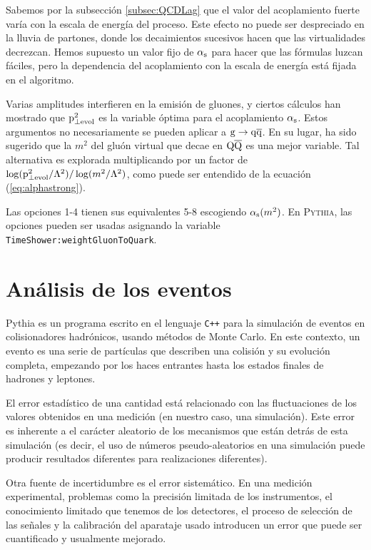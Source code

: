 \documentclass[a4paper,12pt]{article}
\begin{document}
Sabemos por la subsección \ref{subsec:QCDLag} que el valor del acoplamiento fuerte varía con la escala de energía del proceso. Este efecto no puede ser despreciado en la lluvia de partones, donde los decaimientos sucesivos hacen que las virtualidades decrezcan. Hemos supuesto un valor fijo de $\alpha_{\mathrm{s}}$ para hacer que las fórmulas luzcan fáciles, pero la dependencia del acoplamiento con la escala de energía está fijada en el algoritmo.

Varias amplitudes interfieren en la emisión de gluones, y ciertos cálculos han mostrado que ${\mathrm p}^2_{\perp\mathrm{evol}}$ es la variable óptima para el acoplamiento $\alpha_{\mathrm{s}}$. Estos argumentos no necesariamente se pueden aplicar a ${\mathrm g}\to{\mathrm q}\overline{\mathrm q}$. En su lugar, ha sido sugerido que la $m^2$ del gluón virtual que decae en ${\mathrm Q}\overline{\mathrm Q}$ es una mejor variable. Tal alternativa es explorada multiplicando por un factor de $\log({\mathrm p}^2_{\perp\mathrm{evol}}/\Lambda^2)/\log(m^2/\Lambda^2)$, como puede ser entendido de la ecuación (\ref{eq:alphastrong}).

Las opciones 1-4 tienen sus equivalentes 5-8 escogiendo $\alpha_{\mathrm{s}}(m^2)$. En \textsc{Pythia}, las opciones pueden ser usadas asignando la variable \verb|TimeShower:weightGluonToQuark|.


\section{Análisis de los eventos}
\label{sec:analysis}

Pythia es un programa escrito en el lenguaje \verb|C++| para la simulación de eventos en colisionadores hadrónicos, usando métodos de Monte Carlo. En este contexto, un evento es una serie de partículas que describen una colisión y su evolución completa, empezando por los haces entrantes hasta los estados finales de hadrones y leptones.

El error estadístico de una cantidad está relacionado con las fluctuaciones de los valores obtenidos en una medición (en nuestro caso, una simulación). Este error es inherente a el carácter aleatorio de los mecanismos que están detrás de esta simulación (es decir, el uso de números pseudo-aleatorios en una simulación puede producir resultados diferentes para realizaciones diferentes).

Otra fuente de incertidumbre es el error sistemático. En una medición experimental, problemas como la precisión limitada de los instrumentos, el conocimiento limitado que tenemos de los detectores, el proceso de selección de las señales y la calibración del aparataje usado introducen un error que puede ser cuantificado y usualmente mejorado.
\end{document}
